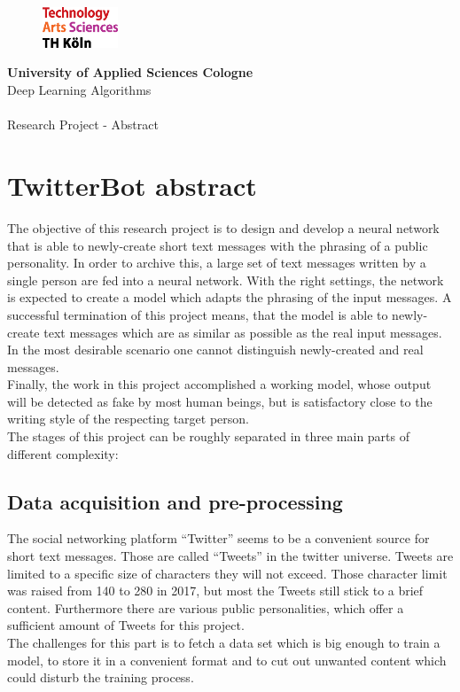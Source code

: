 \documentclass[a4paper,11pt,oneside]{article}
\begin{document}
  \pagestyle{fancy} %
  \fancyhead{}
  \fancyhf{}
  \renewcommand{\headrulewidth}{0pt}
  \renewcommand{\footrulewidth}{0.4pt}
  \fancyfoot[R] {}
  \begin{figure}
    \includegraphics[width=0.2\textwidth]{sources/logo_TH-Koeln_CMYK_22pt}
  \end{figure}
  \Large
  \textbf{University of Applied Sciences Cologne}\\
  Deep Learning Algorithms\\
  \\
  \large
  Research Project - Abstract\\

  \section*{TwitterBot abstract}
  The objective of this research project is to design and develop a neural network that is able to newly-create short text messages with the phrasing of a public personality. In order to archive this, a large set of text messages written by a single person are fed into a neural network. With the right settings, the network is expected to create a model which adapts the phrasing of the input messages. A successful termination of this project means, that the model is able to newly-create text messages which are as similar as possible as the real input messages. In the most desirable scenario one cannot distinguish newly-created and real messages.\\
  Finally, the work in this project accomplished a working model, whose output will be detected as fake by most human beings, but is satisfactory close to the writing style of the respecting target person.\\
  
  The stages of this project can be roughly separated in three main parts of different complexity:

  \subsection*{Data acquisition and pre-processing}
  
  The social networking platform ``Twitter'' seems to be a convenient source for short text messages. Those are called ``Tweets'' in the twitter universe. Tweets are limited to a specific size of characters they will not exceed. Those character limit was raised from 140 to 280 in 2017, but most the Tweets still stick to a brief content. Furthermore there are various public personalities, which offer a sufficient amount of Tweets for this project.\\
  The challenges for this part is to fetch a data set which is big enough to train a model, to store it in a convenient format and to cut out unwanted content which could disturb the training process.
  
\end{document}
